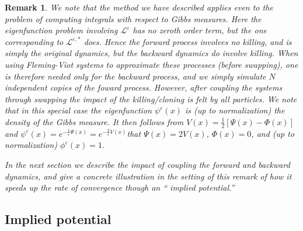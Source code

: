 \documentclass[english,11pt]{article}%
\newtheorem{remark}[theorem]{Remark}
\numberwithin{equation}{section}
\numberwithin{example}{section}
\numberwithin{theorem}{section}
\begin{document}
\begin{remark}
\label{rem:Gibbs}We note that the method we have described applies even to the
problem of computing integrals with respect to Gibbs measures. Here the
eigenfunction problem involving $\mathcal{L}^{\varepsilon}$ has no zeroth
order term, but the one corresponding to $\mathcal{L}^{\varepsilon,\ast}$
does. Hence the forward process involves no killing, and is simply the
original dynamics, but the backward dynamics do involve killing. When using
Fleming-Viot systems to approximate these processes (before swapping), one is
therefore needed only for the backward process, and we simply simulate $N$
independent copies of the foward process. However, after coupling the systems
through swapping the impact of the killing/cloning is felt by all particles.
We note that in this special case the eigenfunction $\psi^{\varepsilon}(x)$ is
(up to normalization) the density of the Gibbs measure. It then follows from
$V(x)=\frac{1}{2}[\Psi(x)-\Phi(x)]$ and $\psi^{\varepsilon}(x)=e^{-\frac
{1}{\varepsilon}\Psi(x)}=e^{-\frac{2}{\varepsilon}V(x)}$that $\Psi(x)=2V(x)$,
$\Phi(x)=0$, and (up to normalization) $\phi^{\varepsilon}(x)=1$.

In the next section we describe the impact of coupling the forward and
backward dynamics, and give a concrete illustration in the setting of this
remark of how it speeds up the rate of convergence though an \textquotedblleft
implied potential.\textquotedblright\ 
\end{remark}

\subsection{Implied potential}

\label{sec:imppot}
\end{document}
